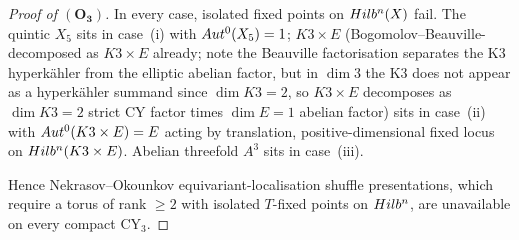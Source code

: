 \begin{proof}[Proof of $(\mathbf{O_3})$]
In every case, isolated fixed points on $Hilb^n(X)$ fail. The quintic
$X_5$ sits in case~(i) with $Aut^0(X_5) = 1$; $K3 \times E$
(Bogomolov--Beauville-decomposed as $K3 \times E$ already; note the
Beauville factorisation separates the K3 hyperkähler from the elliptic
abelian factor, but in $\dim 3$ the K3 does not appear as a
hyperkähler summand since $\dim K3 = 2$, so $K3\times E$ decomposes as
$\dim K3 = 2$ strict CY factor times $\dim E = 1$ abelian factor) sits
in case~(ii) with $Aut^0(K3 \times E) = E$ acting by translation,
positive-dimensional fixed locus on $Hilb^n(K3 \times E)$. Abelian
threefold $A^3$ sits in case~(iii).

Hence Nekrasov--Okounkov equivariant-localisation shuffle presentations,
which require a torus of rank $\geq 2$ with isolated $T$-fixed points
on $Hilb^n$, are unavailable on every compact CY$_3$.
\end{proof}

